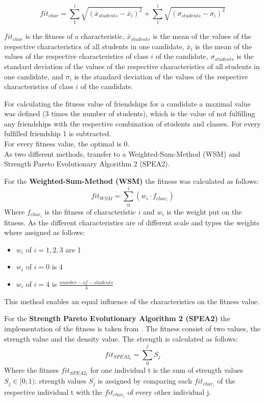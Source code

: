 \begin{onehalfspace}
\begin{equation}
    fit_{char} = \sum_{1}^{i}\sqrt{(\bar{x}_{students}-\bar{x}_{i})^2} + \sum_{1}^{i}\sqrt{(\sigma_{students}-\sigma_{i})^2}
    \label{eq:fitness}
\end{equation}

$fit_{char}$ is the fitness of a characteristic, $\bar{x}_{students}$ is the mean of the values of 
the respective characteristics of all students in one candidate, $\bar{x}_{i}$ is the mean 
of the values of the respective characteristics of class $i$ of the candidate, $\sigma_{students}$ is
 the standard deviation of the values of the respective characteristics of all students in one candidate, 
 and $\sigma_{i}$ is the standard deviation  of the
 values of the respective characteristics of class $i$ of the candidate. 

For calculating the fitness value of friendships for a candidate a maximal 
value was defined (3 times the number of students), which is the value of not fulfilling 
any friendships with the respective combination of students and classes. For every fulfilled 
friendship 1 is subtracted. 
\\

For every fitness value, the optimal is 0.
\\

As two different methods, transfer to a Weighted-Sum-Method (WSM) and Strength 
Pareto Evolutionary Algorithm 2 (SPEA2).

For the \textbf{Weighted-Sum-Method (WSM)} the fitness was calculated as follows:
\begin{equation}
  fit_{WSM} = \sum_{0}^{i}(w_i \cdot f_{char_i})
  \label{eq:WSM}
\end{equation}
Where  $f_{char_i}$ is the fitness of characteristic $i$ and $w_i$ is the weight put on the fitness.
As the different characteristics are of different scale and types the weights where assigned as follows:
\begin{itemize}
\item $w_i$ of $i = 1,2,3$ are 1
\item  $w_i$ of $i = 0$ is 4
\item $w_i$ of $i = 4$ is $\frac{number-of-students}{4}$
\end{itemize}
This method enables an equal influence of the characteristics on the fitness value.

For the \textbf{Strength Pareto Evolutionary Algorithm 2 (SPEA2)} the implementation of the fitness is 
taken from \citet{zitzler2001spea2}. The fitness consist of two values, the strength value and the density value.
The strength is calculated as follows:
\begin{equation}
  fit_{SPEA2_t} = \sum_{0}^{j}S_j
  \label{eq:WSM}
\end{equation}
Where the fitness $fit_{SPEA2_t}$ for one individual t is the sum of strength values $S_j 	\in [0; 1) $.
strength values $S_j$ is assigned by comparing each $fit_{char_i}$ of the respective individual t with 
the $fit_{char_i}$ of every other individual j. 



\end{onehalfspace}
